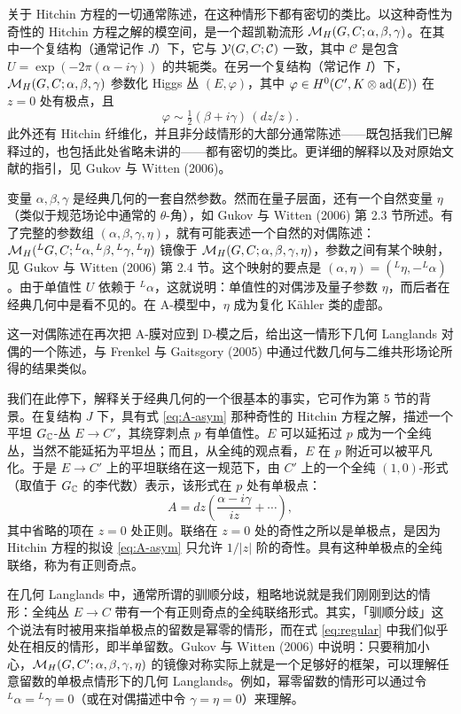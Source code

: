 关于 Hitchin 方程的一切通常陈述，在这种情形下都有密切的类比。以这种奇性为奇性的 Hitchin 方程之解的模空间，是一个超凯勒流形 $\mathcal{M}_{H}(G,C;\alpha,\beta,\gamma)$。在其中一个复结构（通常记作 $J$）下，它与 $\mathcal{Y}(G,C;\mathcal{C})$ 一致，其中 $\mathcal{C}$ 是包含 $U=\exp(-2\pi(\alpha-i\gamma))$ 的共轭类。在另一个复结构（常记作 $I$）下，$\mathcal{M}_{H}(G,C;\alpha,\beta,\gamma)$ 参数化 Higgs 丛 $(E,\varphi)$，其中 $\varphi\in H^{0}(C',K\otimes\operatorname{ad}(E))$ 在 $z=0$ 处有极点，且
\[
\varphi\sim\tfrac12(\beta+i\gamma)\,(dz/z).
\]
此外还有 Hitchin 纤维化，并且非分歧情形的大部分通常陈述——既包括我们已解释过的，也包括此处省略未讲的——都有密切的类比。更详细的解释以及对原始文献的指引，见 Gukov 与 Witten (2006)。

变量 $\alpha,\beta,\gamma$ 是经典几何的一套自然参数。然而在量子层面，还有一个自然变量 $\eta$（类似于规范场论中通常的 $\theta$-角），如 Gukov 与 Witten (2006) 第 2.3 节所述。有了完整的参数组 $(\alpha,\beta,\gamma,\eta)$，就有可能表述一个自然的对偶陈述：$\mathcal{M}_{H}({}^{L}G,C;{}^{L}\alpha,{}^{L}\beta,{}^{L}\gamma,{}^{L}\eta)$ 镜像于 $\mathcal{M}_{H}(G,C;\alpha,\beta,\gamma,\eta)$，参数之间有某个映射，见 Gukov 与 Witten (2006) 第 2.4 节。这个映射的要点是 $(\alpha,\eta)=({}^{L}\eta,-{}^{L}\alpha)$。由于单值性 $U$ 依赖于 ${}^{L}\alpha$，这就说明：单值性的对偶涉及量子参数 $\eta$，而后者在经典几何中是看不见的。在 A-模型中，$\eta$ 成为复化 Kähler 类的虚部。

这一对偶陈述在再次把 A-膜对应到 D-模之后，给出这一情形下几何 Langlands 对偶的一个陈述，与 Frenkel 与 Gaitsgory (2005) 中通过代数几何与二维共形场论所得的结果类似。

\begin{remark}
我们在此停下，解释关于经典几何的一个很基本的事实，它可作为第 5 节的背景。在复结构 $J$ 下，具有式 \eqref{eq:A-asym} 那种奇性的 Hitchin 方程之解，描述一个平坦 $G_{\mathbb{C}}$-丛 $E\to C'$，其绕穿刺点 $p$ 有单值性。$E$ 可以延拓过 $p$ 成为一个全纯丛，当然不能延拓为平坦丛；而且，从全纯的观点看，$E$ 在 $p$ 附近可以被平凡化。于是 $E\to C'$ 上的平坦联络在这一规范下，由 $C'$ 上的一个全纯 $(1,0)$-形式（取值于 $G_{\mathbb{C}}$ 的李代数）表示，该形式在 $p$ 处有单极点：
\begin{equation}
A=dz\left(\frac{\alpha-i\gamma}{iz}+\cdots\right),
\label{eq:regular}
\end{equation}
其中省略的项在 $z=0$ 处正则。联络在 $z=0$ 处的奇性之所以是单极点，是因为 Hitchin 方程的拟设 \eqref{eq:A-asym} 只允许 $1/|z|$ 阶的奇性。具有这种单极点的全纯联络，称为有正则奇点。

在几何 Langlands 中，通常所谓的驯顺分歧，粗略地说就是我们刚刚到达的情形：全纯丛 $E\to C$ 带有一个有正则奇点的全纯联络形式。其实，「驯顺分歧」这个说法有时被用来指单极点的留数是幂零的情形，而在式 \eqref{eq:regular} 中我们似乎处在相反的情形，即半单留数。Gukov 与 Witten (2006) 中说明：只要稍加小心，$\mathcal{M}_{H}(G,C';\alpha,\beta,\gamma,\eta)$ 的镜像对称实际上就是一个足够好的框架，可以理解任意留数的单极点情形下的几何 Langlands。例如，幂零留数的情形可以通过令 ${}^{L}\alpha={}^{L}\gamma=0$（或在对偶描述中令 $\gamma=\eta=0$）来理解。
\end{remark}
